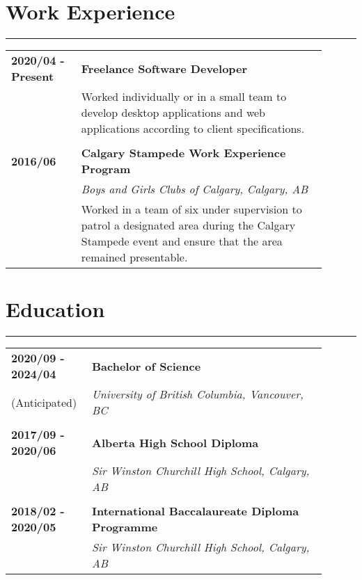 \documentclass[letterpaper]{article}
\newcommand{\horizontalLine}{%
    \rule{\linewidth}{0.2pt}
    \vspace{1ex}
}
\begin{document}
    \section*{Work Experience}

        \horizontalLine

        \begin{tabular}{p{0.2\linewidth} p{0.7\linewidth}} 
            \textbf{2020/04 - Present} & \large\textbf{Freelance Software Developer} \\
            & Worked individually or in a small team to develop desktop applications and web applications according to client specifications. \\
            \\
            \textbf{2016/06} & \large\textbf{Calgary Stampede Work Experience Program} \\
            & \emph{Boys and Girls Clubs of Calgary, Calgary, AB} \\
            & Worked in a team of six under supervision to patrol a designated area during the Calgary Stampede event and ensure that the area remained presentable. \\
        \end{tabular}

    \section*{Education}

        \horizontalLine

        \begin{tabular}{p{0.2\linewidth} p{0.7\linewidth}} 
            \textbf{2020/09 - 2024/04} & \large\textbf{Bachelor of Science} \\
            (Anticipated) & \emph{University of British Columbia, Vancouver, BC} \\
            \\
            \textbf{2017/09 - 2020/06} & \large\textbf{Alberta High School Diploma} \\
            & \emph{Sir Winston Churchill High School, Calgary, AB} \\
            \\
            \textbf{2018/02 - 2020/05} & \large\textbf{International Baccalaureate Diploma Programme} \\
            & \emph{Sir Winston Churchill High School, Calgary, AB} \\
        \end{tabular}
\end{document}
